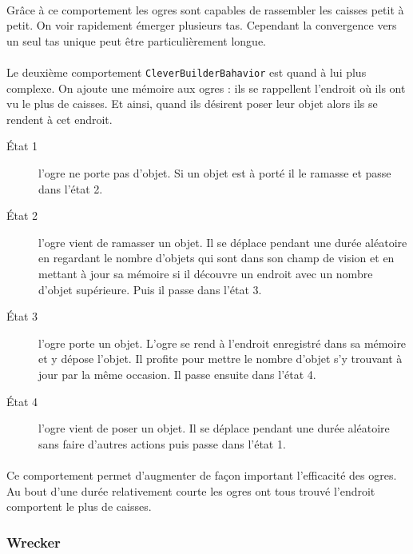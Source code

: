\paragraph{}Grâce à ce comportement les ogres sont capables de rassembler les caisses
petit à petit. On voir rapidement émerger plusieurs tas. Cependant la
convergence vers un seul tas unique peut être particulièrement longue.

\paragraph{}Le deuxième comportement \texttt{CleverBuilderBahavior} est quand à lui plus
complexe. On ajoute une mémoire aux ogres : ils se rappellent l'endroit où ils ont vu le
plus de caisses. Et ainsi, quand ils désirent poser leur objet alors ils se rendent à
cet endroit.

\begin{description}
    \item[\'Etat 1] l'ogre ne porte pas d'objet. Si un objet est à porté il
        le ramasse et passe dans l'état 2.
    \item[\'Etat 2] l'ogre vient de ramasser un objet. Il se déplace pendant une
        durée aléatoire en regardant le nombre d'objets qui sont dans son
        champ de vision et en mettant à jour sa mémoire si il découvre un
        endroit avec un nombre d'objet supérieure. Puis il passe dans l'état 3.
    \item[\'Etat 3] l'ogre porte un objet. L'ogre se rend à l'endroit
        enregistré dans sa mémoire et y dépose l'objet. Il profite pour mettre
        le nombre d'objet s'y trouvant à jour par la même occasion. Il passe
        ensuite dans l'état 4.
    \item[\'Etat 4] l'ogre vient de poser un objet. Il se déplace pendant une
        durée aléatoire sans faire d'autres actions puis passe dans l'état 1.
\end{description}

\paragraph{}Ce comportement permet d'augmenter de façon important l'efficacité
des ogres. Au bout d'une durée relativement courte les ogres ont tous trouvé
l'endroit comportent le plus de caisses. 

\subsubsection{Wrecker}
